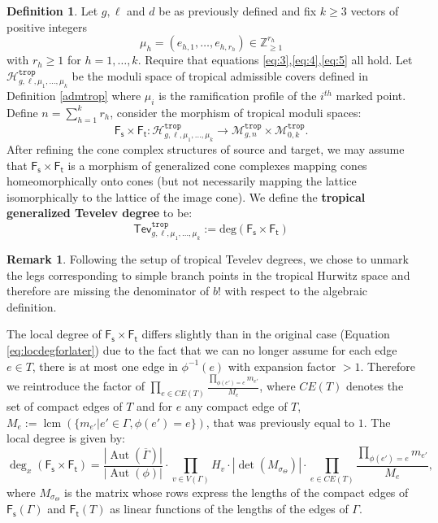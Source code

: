 \documentclass[11pt,reqno]{amsart}
\theoremstyle{definition}
\newtheorem{definition}[theorem]{Definition}
\newtheorem{remark}[theorem]{Remark}
\newcommand{\Z}{\mathds{Z}}
\newcommand\trop{{\mathtt{trop}}}
\newcommand{\dg}{\mathrm{deg}}
\DeclareMathOperator{\Aut}{\mathrm Aut}
\DeclareMathOperator{\lcm}{lcm}
\newcommand\Mgn[1]{\mathcal M_{#1}}
\newcommand\Hur[1]{\mathcal H_{#1}}
\newcommand{\Ft}{\mathsf{F_t}}
\newcommand{\Fs}{\mathsf{F_s}}
\newcommand{\Tev}{{\mathsf{Tev}}}
\begin{document}
\begin{definition}\label{def:gentroptev}
Let $g,\ell$ and $d$ be as previously defined and fix $k\geq3$ vectors of positive integers \[\mu_h=(e_{h,1},\dots,e_{h,r_h})\in\Z_{\geq1}^{r_h}\]
with $r_h\geq1$ for $h=1,\dots,k$. Require that equations \ref{eq:3},\ref{eq:4},\ref{eq:5} all hold. Let $\Hur{g,\ell,\mu_1,\dots,\mu_k}^\trop$ be the moduli space of tropical admissible covers defined in Definition \ref{admtrop} where $\mu_i$ is the ramification profile of the $i^{th}$ marked point.
Define $n=\sum_{h=1}^kr_h$, consider the morphism of tropical moduli spaces:
\begin{equation}
    \Fs\times \Ft: \Hur{g,\ell,\mu_1,\dots,\mu_k}^\trop \to \Mgn{g,n}^\trop \times \Mgn{0,k}^\trop.
\end{equation}
After refining the cone complex structures of source and target, we may assume that $\Fs\times \Ft$ is a morphism of generalized cone complexes mapping cones homeomorphically onto cones (but not necessarily mapping the lattice isomorphically to the lattice of the image cone). We define the {\bf tropical generalized Tevelev degree} to be:
\begin{equation}
    \Tev^\trop_{g,\ell,\mu_1,\dots,\mu_k}:={\dg (\Fs\times \Ft)}
\end{equation}
\end{definition}
   \begin{remark}
   Following the setup of tropical Tevelev degrees, we chose to unmark the legs corresponding to simple branch points in the tropical Hurwitz space and therefore are missing the denominator of $b!$ with respect to the algebraic definition.
\end{remark}
The local degree of $\Fs\times\Ft$ differs slightly than in the original case (Equation \ref{eq:locdegforlater}) due to the fact that we can no longer assume for each edge $e\in T$, there is at most one edge in $\phi^{-1}(e)$ with expansion factor $>1$. Therefore we reintroduce the factor of $\prod_{e\in CE(T)}\frac{\prod_{\phi(e') = e}m_{e'}}{M_e}$, where $CE(T)$ denotes the set of compact edges of $T$ and for $e$ any compact edge of $T$, $M_e:=\lcm(\{m_{e'}| e'\in \Gamma, \phi(e')=e\})$, that was previously equal to $1$. The local degree is given by:
 \begin{equation}\label{eq:locdegforlater}
     \deg_x (\Fs\times \Ft) =  \frac{|\Aut(\overline{\Gamma})|}{|\Aut(\phi)|}\cdot \prod_{v\in V(\Gamma)} H_v \cdot \left| \det(M_{\sigma_\Theta}) \right|\cdot\prod_{e\in CE(T)}\frac{\prod_{\phi(e') = e}m_{e'}}{M_e},
 \end{equation}
where $M_{\sigma_\Theta}$ is the matrix whose rows express the lengths of the compact edges of $\Fs(\Gamma)$ and $\Ft(T)$ as linear functions of the lengths of the edges of $\Gamma$.
\end{document}
